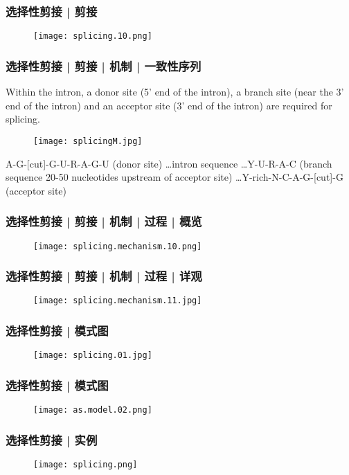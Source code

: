 \begin{frame}
  \frametitle{选择性剪接 | 剪接}
  \begin{figure}
    \centering
    \texttt{[image: splicing.10.png]}
  \end{figure}
\end{frame}

\begin{frame}
  \frametitle{选择性剪接 | 剪接 | 机制 | 一致性序列}
Within the intron, a donor site (5' end of the intron), a branch site (near the 3' end of the intron) and an acceptor site (3' end of the intron) are required for splicing.
  \begin{figure}
    \centering
    \texttt{[image: splicingM.jpg]}
  \end{figure}
A-G-[cut]-G-U-R-A-G-U (donor site) \ldots intron sequence \ldots Y-U-R-A-C (branch sequence 20-50 nucleotides upstream of acceptor site) \ldots Y-rich-N-C-A-G-[cut]-G (acceptor site)
\end{frame}

\begin{frame}
  \frametitle{选择性剪接 | 剪接 | 机制 | 过程 | 概览}
  \begin{figure}
    \centering
    \texttt{[image: splicing.mechanism.10.png]}
  \end{figure}
\end{frame}

\begin{frame}
  \frametitle{选择性剪接 | 剪接 | 机制 | 过程 | 详观}
  \begin{figure}
    \centering
    \texttt{[image: splicing.mechanism.11.jpg]}
  \end{figure}
\end{frame}


\begin{frame}
  \frametitle{选择性剪接 | 模式图}
  \begin{figure}
    \centering
    \texttt{[image: splicing.01.jpg]}
  \end{figure}
\end{frame}

\begin{frame}
  \frametitle{选择性剪接 | 模式图}
  \begin{figure}
    \centering
    \texttt{[image: as.model.02.png]}
  \end{figure}
\end{frame}

\begin{frame}
  \frametitle{选择性剪接 | 实例}
  \begin{figure}
    \centering
    \texttt{[image: splicing.png]}
  \end{figure}
\end{frame}

